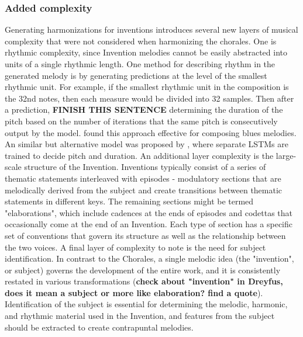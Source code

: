 \documentclass[11pt]{article}
\begin{document}
\subsubsection{Added complexity}
Generating harmonizations for inventions introduces several new layers of musical complexity that were not considered when harmonizing the chorales. One is rhythmic complexity, since Invention melodies cannot be easily abstracted into units of a single rhythmic length. One method for describing rhythm in the generated melody is by generating predictions at the level of the smallest rhythmic unit. For example, if the smallest rhythmic unit in the composition is the 32nd notes, then each measure would be divided into 32 samples. Then after a prediction, \textbf{FINISH THIS SENTENCE} determining the duration of the pitch based on the number of iterations that the same pitch is consecutively output by the model. \citet{eck2002blues} found this approach effective for composing blues melodies. An similar but alternative model was proposed by \citet{franklin2006jazz}, where separate LSTMs are trained to decide pitch and duration. An additional layer complexity is the large-scale structure of the Invention. Inventions typically consist of a series of thematic statements interleaved with episodes - modulatory sections that are melodically derived from the subject and create transitions between thematic statements in different keys. The remaining sections might be termed "elaborations", which include cadences at the ends of episodes and codettas that occasionally come at the end of an Invention. Each type of section has a specific set of conventions that govern its structure as well as the relationship between the two voices. A final layer of complexity to note is the need for subject identification. In contrast to the Chorales, a single melodic idea (the "invention", or subject) governs the development of the entire work, and it is consistently restated in various transformations (\textbf{check about "invention" in Dreyfus, does it mean a subject or more like elaboration? find a quote}). Identification of the subject is essential for determining the melodic, harmonic, and rhythmic material used in the Invention, and features from the subject should be extracted to create contrapuntal melodies.
\end{document}
